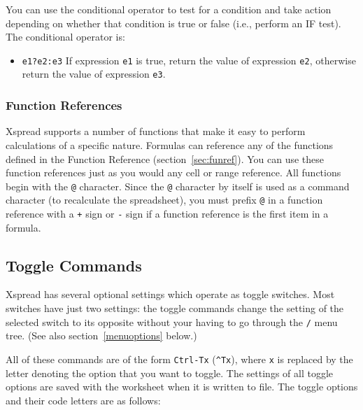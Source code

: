 \documentclass[titlepage]{article}
\begin{document}
You can use the conditional operator to test for a condition and take
action depending on whether that condition is true or false (i.e.,
perform an IF test).  The conditional operator is:

\begin{itemize}
  \item[] \texttt{e1?e2:e3} If expression \texttt{e1} is
  true, return the value of expression \texttt{e2}, otherwise return
  the value of expression \texttt{e3}.
\end{itemize}

\subsubsection{Function References}

\textsf{Xspread} supports a number of functions that make it easy to
perform calculations of a specific nature.  Formulas can reference any
of the functions defined in the Function Reference
(section~\ref{sec:funref}).  You can use these function references
just as you would any cell or range reference.  All functions begin
with the \texttt{@} character.  Since the \texttt{@} character by
itself is used as a command character (to recalculate the
spreadsheet), you must prefix \texttt{@} in a function reference with
a \texttt{+} sign or \texttt{-} sign if a function reference is the
first item in a formula.

\subsection{Toggle Commands}
\label{sec:toggle}

\textsf{Xspread} has several optional settings which operate as toggle
switches.  Most switches have just two settings: the toggle commands
change the setting of the selected switch to its opposite without
your having to go through the \texttt{/} menu tree.  (See also
section~\ref{menuoptions} below.)

All of these commands are of the form \texttt{Ctrl-Tx}
(\texttt{\^{}Tx}), where \texttt{x} is replaced by the letter denoting
the option that you want to toggle.  The settings of all toggle
options are saved with the worksheet when it is written to file.  The
toggle options and their code letters are as follows:
\end{document}
